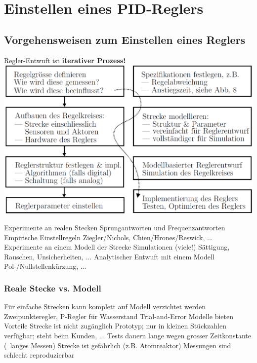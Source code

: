 
\section{Einstellen eines PID-Reglers} 

\subsection{Vorgehensweisen zum Einstellen eines Reglers}

\begin{minipage}[c]{0.43\columnwidth}
    Regler-Entwuft ist \textbf{iterativer Prozess!}
    \includegraphics[width=\columnwidth]{images/reglerentwurf_moegliche_schritte.png}
\end{minipage}
\hfill
\begin{minipage}[c]{0.56\columnwidth}
    \begin{outline}
        \1 Experimente an realen Stecken
            \2 Sprungantworten und Frequenzantworten
        \1 Empirische Einstellregeln
            \2 Ziegler/Nichols, Chien/Hrones/Reswick, ...
        \1 Experimente an einem Modell der Strecke
            \2 Simulationen (viele!)
            \2 Sättigung, Rauschen, Unsicherheiten, ...
        \1 Analytischer Entwuft mit einem Modell
            \2 Pol-/Nullstellenkürzung, ...
    \end{outline}
\end{minipage}


\subsubsection{Reale Stecke vs. Modell}

\begin{outline}
    \1 Für einfache Strecken kann komplett auf Modell verzichtet werden
        \2 Zweipunkteregler, P-Regler für Wasserstand
        \2 Trial-and-Error
    \1 Modelle bieten Vorteile
        \2 Strecke ist nicht zugänglich
            \3 Prototyp; nur in kleinen Stückzahlen verfügbar; steht beim Kunden, ...
        \2 Tests dauern lange wegen grosser Zeitkonstante (\textrightarrow\ langes Messen)
        \2 Strecke ist gefährlich (z.B. Atomreaktor)
        \2 Messungen sind schlecht reproduzierbar
\end{outline}


